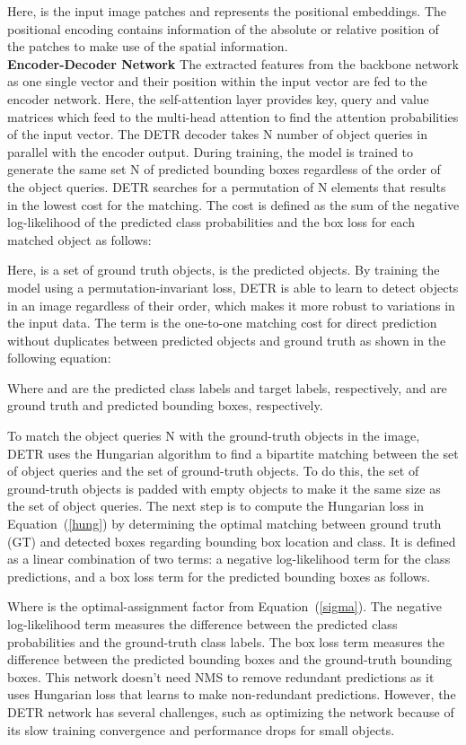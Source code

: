 \documentclass[sn-mathphys]{sn-jnl}\jyear{2021}\theoremstyle{thmstyleone}\newtheorem{theorem}{Theorem}\newtheorem{proposition}[theorem]{Proposition}\theoremstyle{thmstyletwo}\newtheorem{example}{Example}\newtheorem{remark}{Remark}\theoremstyle{thmstylethree}\newtheorem{definition}{Definition}\usepackage{amsmath}
\begin{document}
Here,  is the input image patches and  represents the positional embeddings. The positional encoding contains information of the absolute or relative position of the patches to make use of the spatial information. \\
\noindent\textbf {Encoder-Decoder Network} The extracted features from the backbone network as one single vector and their position within the input vector are fed to the encoder network. Here, the self-attention layer provides key, query and value matrices which feed to the multi-head attention to find the attention probabilities of the input vector. The DETR decoder takes N number of object queries in parallel with the encoder output. During training, the model is trained to generate the same set N of predicted bounding boxes regardless of the order of the object queries. DETR searches for a permutation of N elements  that results in the lowest cost for the matching. The cost is defined as the sum of the negative log-likelihood of the predicted class probabilities and the box loss for each matched object as follows:

Here,  is a set of ground truth objects,  is the predicted objects. By training the model using a permutation-invariant loss, DETR is able to learn to detect objects in an image regardless of their order, which makes it more robust to variations in the input data. The term  is the one-to-one matching cost for direct prediction without duplicates between predicted objects and ground truth as shown in the following equation: 

Where  and  are the predicted class labels and target labels, respectively,  and  are ground truth and predicted bounding boxes, respectively.

To match the object queries N with the ground-truth objects in the image, DETR uses the Hungarian algorithm to find a bipartite matching between the set of object queries and the set of ground-truth objects. To do this, the set of ground-truth objects is padded with empty objects  to make it the same size as the set of object queries. The next step is to compute the Hungarian loss  in Equation~(\ref{hung}) by determining the optimal matching between ground truth (GT) and detected boxes regarding bounding box location and class. It is defined as a linear combination of two terms: a negative log-likelihood term for the class predictions, and a box loss term for the predicted bounding boxes as follows.

Where  is the optimal-assignment factor from Equation~(\ref{sigma}). The negative log-likelihood term measures the difference between the predicted class probabilities and the ground-truth class labels. The box loss term measures the difference between the predicted bounding boxes and the ground-truth bounding boxes. This network doesn't need NMS to remove redundant predictions as it uses Hungarian loss that learns to make non-redundant predictions. However, the DETR network has several challenges, such as optimizing the network because of its slow training convergence and performance drops for small objects.
\end{document}
